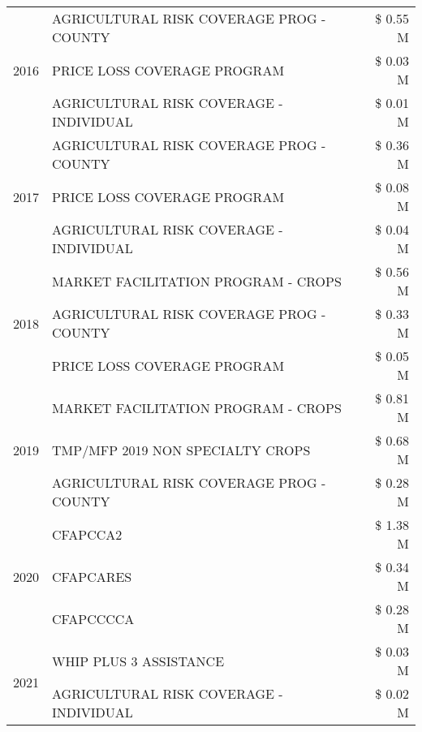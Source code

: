 \begin{tabular}{llr}
\cline{1-3}
\multirow[t]{3}{*}{2016} & AGRICULTURAL RISK COVERAGE PROG - COUNTY & \$ 0.55 M \\
 & PRICE LOSS COVERAGE PROGRAM & \$ 0.03 M \\
 & AGRICULTURAL RISK COVERAGE - INDIVIDUAL & \$ 0.01 M \\
\cline{1-3}
\multirow[t]{3}{*}{2017} & AGRICULTURAL RISK COVERAGE PROG - COUNTY & \$ 0.36 M \\
 & PRICE LOSS COVERAGE PROGRAM & \$ 0.08 M \\
 & AGRICULTURAL RISK COVERAGE - INDIVIDUAL & \$ 0.04 M \\
\cline{1-3}
\multirow[t]{3}{*}{2018} & MARKET FACILITATION PROGRAM - CROPS & \$ 0.56 M \\
 & AGRICULTURAL RISK COVERAGE PROG - COUNTY & \$ 0.33 M \\
 & PRICE LOSS COVERAGE PROGRAM & \$ 0.05 M \\
\cline{1-3}
\multirow[t]{3}{*}{2019} & MARKET FACILITATION PROGRAM - CROPS & \$ 0.81 M \\
 & TMP/MFP 2019 NON SPECIALTY CROPS & \$ 0.68 M \\
 & AGRICULTURAL RISK COVERAGE PROG - COUNTY & \$ 0.28 M \\
\cline{1-3}
\multirow[t]{3}{*}{2020} & CFAPCCA2 & \$ 1.38 M \\
 & CFAPCARES & \$ 0.34 M \\
 & CFAPCCCCA & \$ 0.28 M \\
\cline{1-3}
\multirow[t]{2}{*}{2021} & WHIP PLUS 3 ASSISTANCE & \$ 0.03 M \\
 & AGRICULTURAL RISK COVERAGE - INDIVIDUAL & \$ 0.02 M \\
\cline{1-3}
\bottomrule
\end{tabular}
